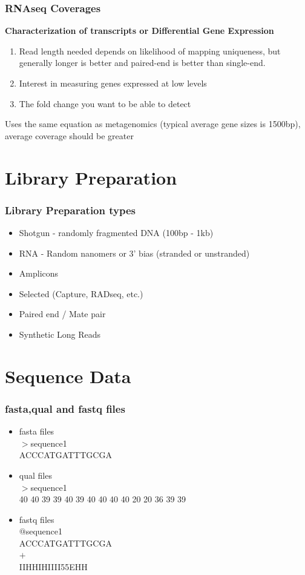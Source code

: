\documentclass{beamer}
\begin{document}
\begin{frame}
\frametitle{RNAseq Coverages}
\textbf{Characterization of transcripts or Differential Gene Expression}

\begin{enumerate}
\item Read length needed depends on likelihood of mapping uniqueness, but generally longer is better and paired-end is better than single-end. 
\item Interest in measuring genes expressed at low levels
\item The fold change you want to be able to detect
\end{enumerate}

\begin{alert}
Uses the same equation as metagenomics (typical average gene sizes is 1500bp), average coverage should be greater
\end{alert}
\end{frame}




\section{Library Preparation}
\begin{frame}
 \frametitle{Library Preparation types}
 \begin{itemize}
 \item Shotgun - randomly fragmented DNA (100bp - 1kb) 
 \item RNA - Random nanomers or 3' bias (stranded or unstranded)
 \item Amplicons
 \item Selected (Capture, RADseq, etc.)
 \item Paired end / Mate pair
 \item Synthetic Long Reads
 \end{itemize}
\end{frame} 


\section{Sequence Data}
\begin{frame}
  \frametitle{fasta,qual and fastq files}
  \begin{itemize}
  \item fasta files\\%
  $>$sequence1\\
  ACCCATGATTTGCGA
  \item qual files\\%
  $>$sequence1\\
  40 40 39 39 40 39 40 40 40 40 20 20 36 39 39
  \item fastq files\\%
  $@$sequence1\\
  ACCCATGATTTGCGA\\
  $+$\\
  IIHHIHIIII55EHH
  \end{itemize}
\end{frame}
\end{document}

